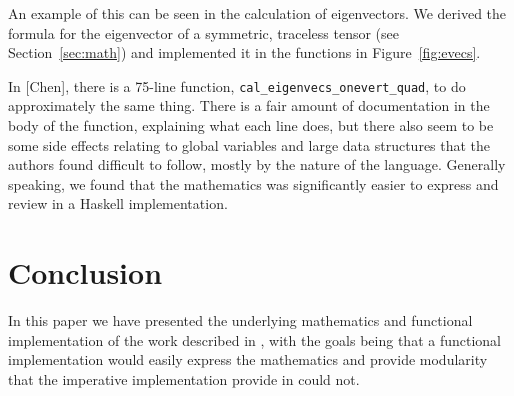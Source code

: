 \documentclass[twocolumn]{article}
\begin{document}
An example of this can be seen in the calculation of eigenvectors. We derived
the formula for the eigenvector of a symmetric, traceless tensor
(see Section~\ref{sec:math}) and implemented it in the functions in
Figure~\ref{fig:evecs}.

In [Chen], there is a 75-line function,
\texttt{cal\_eigenvecs\_onevert\_quad}, to do approximately the same thing. There
is a fair amount of documentation in the body of the function, explaining what
each line does, but there also seem to be some side effects relating to global
variables and large data structures that the authors found difficult to follow,
mostly by the nature of the language.  Generally speaking, we found that the
mathematics was significantly easier to express and review in a Haskell
implementation.

\section{Conclusion}
In this paper we have presented the underlying mathematics and functional
implementation of the work described in \cite{chen}, with the goals being that a
functional implementation would easily express the mathematics and provide
modularity that the imperative implementation provide in \cite{chen} could not.




\end{document}

